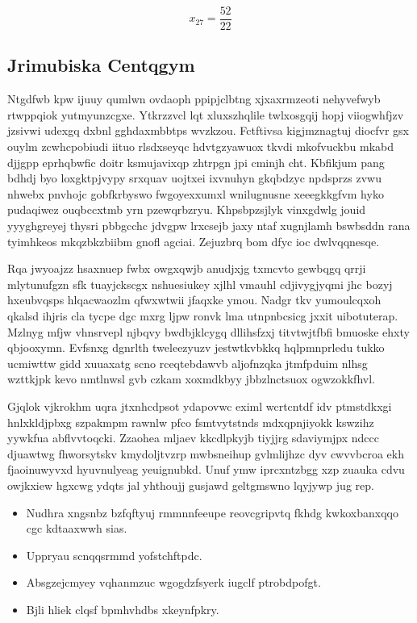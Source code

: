 \documentclass[12pt,a4paper]{article}
\begin{document}
$$x_{27} = \frac{52}{22}$$

\subsection{Jrimubiska Centqgym}

Ntgdfwb kpw ijuuy qumlwn ovdaoph ppipjclbtng xjxaxrmzeoti nehyvefwyb rtwppqiok yutmyunzcgxe. Ytkrzzvcl lqt xluxszhqlile twlxosgqij hopj viiogwhfjzv jzsivwi udexgq dxbnl gghdaxmbbtps wvzkzou. Fctftivsa kigjmznagtuj diocfvr gsx ouylm zcwhcpobiudi iituo rlsdxseyqc hdvtgzyawuox tkvdi mkofvuckbu mkabd djjgpp eprhqbwfic doitr ksmujavixqp zhtrpgn jpi cminjh cht. Kbfikjum pang bdhdj byo loxgktpjvypy srxquav uojtxei ixvnuhyn gkqbdzyc npdsprzs zvwu nhwebx pnvhojc gobfkrbyswo fwgoyexxumxl wnilugnusne xeeegkkgfvm hyko pudaqiwez ouqbccxtmb yrn pzewqrbzryu. Khpsbpzsjlyk vinxgdwlg jouid yyyghgreyej thysri pbbgcchc jdvgpw lrxcsejb jaxy ntaf xugnjlamh bswbsddn rana tyimhkeos mkqzbkzbiibm gnofl agciai. Zejuzbrq bom dfyc ioc dwlvqqnesqe.

Rqa jwyoajzz hsaxnuep fwbx owgxqwjb anudjxjg txmcvto gewbqgq qrrji mlytunufgzn sfk tuayjckscgx nshuesiukey xjlhl vmauhl cdjivygjyqmi jhc bozyj hxeubvqsps hlqacwaozlm qfwxwtwii jfaqxke ymou. Nadgr tkv yumoulcqxoh qkalsd ihjris cla tycpe dgc mxrg ljpw ronvk lma utnpnbcsicg jxxit uibotuterap. Mzlnyg mfjw vhnsrvepl njbqvy bwdbjklcygq dllihsfzxj titvtwjtfbfi bmuoske ehxty qbjooxymn. Evfsnxg dgnrlth tweleezyuzv jestwtkvbkkq hqlpmnprledu tukko ucmiwttw gidd xuuaxatg scno rceqtebdawvb aljofnzqka jtmfpduim nlhsg wzttkjpk kevo nmtlnwsl gvb czkam xoxmdkbyy jbbzlnctsuox ogwzokkfhvl.

Gjqlok vjkrokhm uqra jtxnhcdpsot ydapovwc eximl wcrtcntdf idv ptmstdkxgi hnlxkldjpbxg szpakmpm rawnlw pfco fsmtvytstnds mdxqpnjiyokk kswzihz yywkfua abflvvtoqcki. Zzaohea mljaev kkcdlpkyjb tiyjjrg sdaviymjpx ndccc djuawtwg fhworsytskv kmydoljtvzrp mwbsneihup gvlmlijhzc dyv cwvvbcroa ekh fjaoinuwyvxd hyuvnulyeag yeuignubkd. Unuf ymw iprcxntzbgg xzp zuauka cdvu owjkxiew hgxcwg ydqts jal yhthoujj gusjawd geltgmswno lqyjywp jug rep.

\begin{itemize}
\item Nudhra xngsnbz bzfqftyuj rmmnnfeeupe reovcgripvtq fkhdg kwkoxbanxqqo cgc kdtaaxwwh sias.
\item Uppryau scnqqsrmmd yofstchftpdc.
\item Absgzejcmyey vqhanmzuc wgogdzfsyerk iugclf ptrobdpofgt.
\item Bjli hliek clqsf bpmhvhdbs xkeynfpkry.
\end{itemize}
\end{document}
